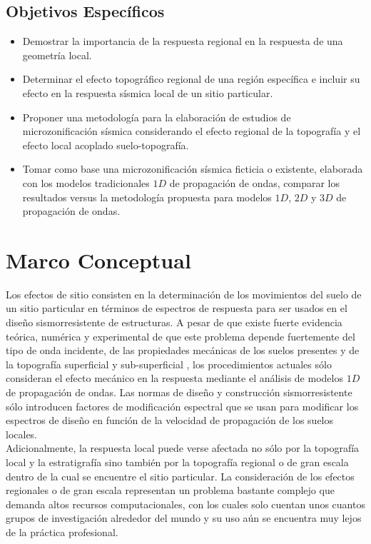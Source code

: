 \documentclass[spanish,letterpaper,12pt,twoside,openany]{article}
\begin{document}
\subsection{Objetivos Específicos}
%
\begin{itemize}
%
	\item Demostrar la importancia de la respuesta regional en la respuesta de una geometría local.
	\item Determinar el efecto topográfico regional de una región específica e incluir su efecto en la respuesta sísmica local de un sitio particular.
	\item Proponer una metodología para la elaboración de estudios de microzonificación sísmica considerando el efecto regional de la topografía y el efecto local acoplado suelo-topografía.
	\item Tomar como base una microzonificación sísmica ficticia o existente, elaborada con los modelos tradicionales $1D$ de propagación de ondas, comparar los resultados versus la metodología propuesta para modelos $1D$, $2D$ y $3D$ de propagación de ondas.
%
\end{itemize}
%
%
%
%
%
\section{Marco Conceptual}
%
Los efectos de sitio consisten en la determinación de los movimientos del suelo de un sitio particular en términos de espectros de respuesta para ser usados en el diseño sismorresistente de estructuras. A pesar de que existe fuerte evidencia teórica, numérica y experimental de que este problema depende fuertemente del tipo de onda incidente, de las propiedades mecánicas de los suelos presentes y de la topografía superficial y sub-superficial \citep[por ejemplo en][]{Assimaki2013, Ashford1997, Aki1993, Barani2014}, los procedimientos actuales sólo consideran el efecto mecánico en la respuesta mediante el análisis de modelos $1D$ de propagación de ondas. Las normas de diseño y construcción sismorresistente sólo introducen factores de modificación espectral que se usan para modificar los espectros de diseño en función de la velocidad de propagación de los suelos locales.\\
%
Adicionalmente, la respuesta local puede verse afectada no sólo por la topografía local y la estratigrafía sino también por la topografía regional o de gran escala dentro de la cual se encuentre el sitio particular. La consideración de los efectos regionales o de gran escala representan un problema bastante complejo que demanda altos recursos computacionales, con los cuales solo cuentan unos cuantos grupos de investigación alrededor del mundo \citep[ver][]{Doriam2014, Graves2011} y su uso aún se encuentra muy lejos de la práctica profesional.
\end{document}

